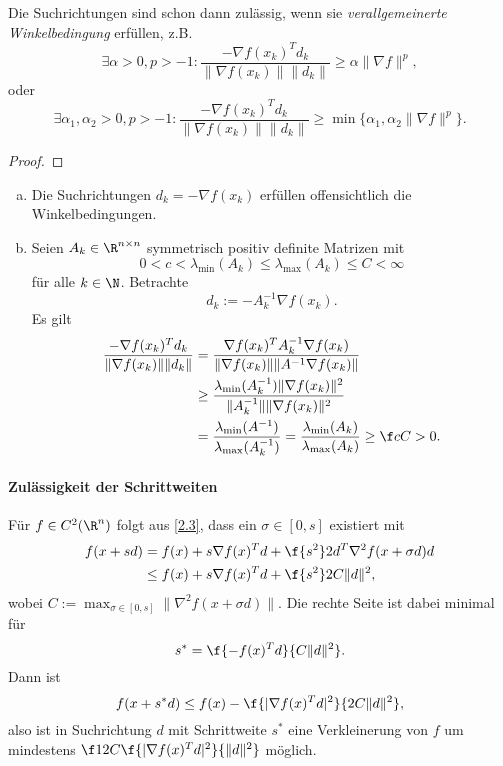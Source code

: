 

\begin{nt} \label{2.31}
	Die Suchrichtungen sind schon dann zulässig, wenn sie \emph{verallgemeinerte Winkelbedingung} erfüllen, z.B.
	\[
		\exists \alpha > 0, p > -1
		: \dfrac {-\nabla f(x_k)^T d_k}{\|\nabla f(x_k)\| \|d_k\|}
		\ge \alpha \|\nabla f\|^p,
	\]
	oder
	\[
		\exists \alpha_1, \alpha_2 > 0, p > -1
		: \dfrac {-\nabla f(x_k)^Td_k}{\|\nabla f(x_k)\|\|d_k\|} \ge \min\{ \alpha_1, \alpha_2 \|\nabla f\|^p \}.
	\]
	\begin{proof}
	\end{proof}
\end{nt}

\begin{ex} \label{2.32}
	\begin{enumerate}[(a)]
		\item
			Die Suchrichtungen $d_k = -\nabla f(x_k)$ erfüllen offensichtlich die Winkelbedingungen.
		\item
			Seien $A_k \in \R^{n\times n}$ symmetrisch positiv definite Matrizen mit
			\[
				0
				< c
				< \lambda_{\text{min}}(A_k)
				\le \lambda_{\text{max}}(A_k)
				\le C
				< \infty
			\]
			für alle $k \in \N$.
			Betrachte
			\[
				d_k := - A_k^{-1} \nabla f(x_k).
			\]
			Es gilt
			\begin{align*}
				\dfrac {-\nabla f(x_k)^T d_k}{\|\nabla f(x_k)\|\|d_k\|}
				&= \dfrac {\nabla f(x_k)^T A_k^{-1} \nabla f(x_k)}{\|\nabla f(x_k)\|\|A^{-1} \nabla f(x_k)\|} \\
				&\ge \dfrac {\lambda_{\text{min}} (A_k^{-1}) \|\nabla f(x_k)\|^2}{\|A_k^{-1}\| \|\nabla f(x_k)\|^2} \\
				&= \dfrac {\lambda_{\text{min}}(A^{-1})}{\lambda_{\text{max}}(A_k^{-1})}
				= \dfrac {\lambda_{\text{min}}(A_k)}{\lambda_{\text{max}}(A_k)}
				\ge \f cC
				> 0.
			\end{align*}
	\end{enumerate}
\end{ex}

\paragraph{Zulässigkeit der Schrittweiten}
Für $f \in C^2(\R^n)$ folgt aus \ref{2.3}, dass ein $\sigma \in [0,s]$ existiert mit
\begin{align*}
	f(x+sd)
	&= f(x) + s\nabla f(x)^T d + \f {s^2}2 d^T \nabla^2 f(x + \sigma d)d \\
	&\le f(x) + s\nabla f(x)^T d + \f {s^2}2 C \|d\|^2,
\end{align*}
wobei $C := \max_{\sigma\in[0,s]} \|\nabla^2 f(x + \sigma d) \|$.
Die rechte Seite ist dabei minimal für
\[
	s^* = \f{-f(x)^T d}{C\|d\|^2}.
\]
Dann ist
\[
	f(x+s^*d)
	\le f(x) - \f{|\nabla f(x)^T d|^2}{2C\|d\|^2},
\]
also ist in Suchrichtung $d$ mit Schrittweite $s^*$ eine Verkleinerung von $f$ um mindestens $\f 1{2C} \f {|\nabla f(x)^T d|^2}{\|d\|^2}$ möglich.

